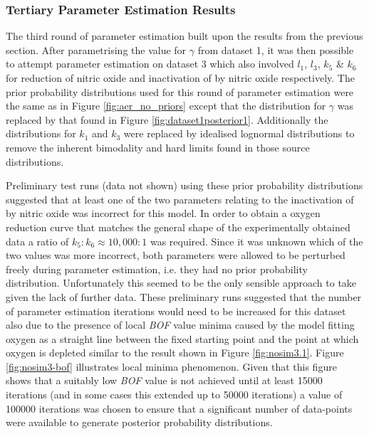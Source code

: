 \subsubsection{Tertiary Parameter Estimation Results}
The third round of parameter estimation built upon the results from the previous section. After parametrising the value for $\gamma$ from dataset 1, it was then possible to attempt parameter estimation on dataset 3 which also involved $l_1$, $l_3$, $k_5$ \& $k_6$ for reduction of nitric oxide and inactivation of \cbbthree{} by nitric oxide respectively. The prior probability distributions used for this round of parameter estimation were the same as in Figure \ref{fig:aer_no_priors} except that the distribution for $\gamma$ was replaced by that found in Figure \ref{fig:dataset1posterior1}. Additionally the distributions for $k_1$ and $k_3$ were replaced by idealised lognormal distributions to remove the inherent bimodality and hard limits found in those source distributions.

Preliminary test runs (data not shown) using these prior probability distributions suggested that at least one of the two parameters relating to the inactivation of \cbbthree{} by nitric oxide was incorrect for this model. In order to obtain a oxygen reduction curve that matches the general shape of the experimentally obtained data a ratio of $k_5:k_6 \approx 10,000:1$ was required. Since it was unknown which of the two values was more incorrect, both parameters were allowed to be perturbed freely during parameter estimation, i.e. they had no prior probability distribution. Unfortunately this seemed to be the only sensible approach to take given the lack of further data. These preliminary runs suggested that the number of parameter estimation iterations would need to be increased for this dataset also due to the presence of local \textit{BOF} value minima caused by the model fitting oxygen as a straight line between the fixed starting point and the point at which oxygen is depleted similar to the result shown in Figure \ref{fig:nosim3.1}. Figure \ref{fig:nosim3-bof} illustrates local minima phenomenon. Given that this figure shows that a suitably low \textit{BOF} value is not achieved until at least 15000 iterations (and in some cases this extended up to 50000 iterations) a value of 100000 iterations was chosen to ensure that a significant number of data-points were available to generate posterior probability distributions.

